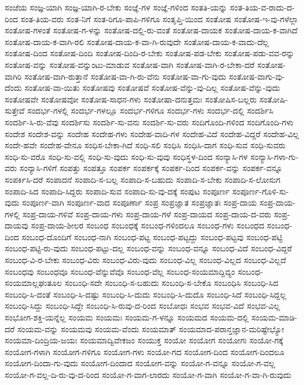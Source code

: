 {ಸಂಜೆಯ
ಸಂಜ್ಞ-ಯಾಗಿ
ಸಂಜ್ಞ-ಯಾಗಿ-ರ-ಬೇಕು
ಸಂಜ್ಞೆ-ಗಳ
ಸಂಜ್ಞೆ-ಗಳಿಂದ
ಸಂತತಿ-ಯನ್ನು
ಸಂತ-ತಿಯ-ವ-ರಾದು-ದ-ರಿಂದ
ಸಂತ-ತಿಯ-ವರು
ಸಂತ-ನಿಗೆ
ಸಂತ-ರಿಗೂ-ಪಾಪಿ-ಗಳಿಗೂ
ಸಂತೃಪ್ತಿ-ಯಿಂದ
ಸಂತೋಷ
ಸಂತೋಷ-ಇ-ವು-ಗಳೆಲ್ಲಾ
ಸಂತೋಷ-ಗಳಂತೆ
ಸಂತೋಷ-ಗ-ಳನ್ನು
ಸಂತೋಷ-ದಲ್ಲಿ-ರು-ವಂತೆ
ಸಂತೋಷ-ದಾಯಕ
ಸಂತೋಷ-ದಾಯ-ಕ-ವಾಗಿದೆ
ಸಂತೋಷ-ದಾಯ-ಕ-ವಾಗಿ-ರಲಿ
ಸಂತೋಷ-ದಾಯ-ಕ-ವಾ-ಗಿ-ರುವುದೇ
ಸಂತೋಷ-ದಾಯ-ಕ-ವಾದು-ದೆಲ್ಲ
ಸಂತೋಷ-ದಿಂದ
ಸಂತೋಷ-ದಿಂದಿ
ಸಂತೋಷ-ದಿಂದಿ-ರ-ಬೇಕು
ಸಂತೋಷ-ಪಡ-ಬೇಕು
ಸಂತೋಷ-ಪಡು-ವವ-ರನ್ನು
ಸಂತೋಷ-ವನ್ನು
ಸಂತೋಷ-ವನ್ನುಂಟು-ಮಾಡುವ
ಸಂತೋಷ-ವಾಗಿ
ಸಂತೋಷ-ವಾಗಿ-ರ-ಬೇಕಾ-ದರೆ
ಸಂತೋಷ-ವಾಗಿರಿ
ಸಂತೋಷ-ವಾಗಿ-ರುತ್ತಾನೆ
ಸಂತೋಷ-ವಾ-ಗಿ-ರು-ವೆನು
ಸಂತೋಷ-ವಾ-ಗು-ವುದು
ಸಂತೋಷ-ವಾಗು-ವು-ದೆಂದು
ಸಂತೋಷ-ವಾ-ಯಿತು
ಸಂತೋಷವು
ಸಂತೋಷವೆ
ಸಂತೋಷ-ವೆನ್ನು-ವು-ದಿಲ್ಲ
ಸಂತೋಷ-ವೆನ್ನು-ವುದು
ಸಂತೋಷವೇ
ಸಂತೋಷವೋ
ಸಂತೋಷ-ಸಾಧನ-ಗಳು
ಸಂತೋಷಾ-ದನುತ್ತಮಃ
ಸಂತೋಷಿಸ-ಬಲ್ಲರು
ಸಂತೋಷಿ-ಸುತ್ತೇವೆ
ಸಂದರ್ಭ-ಗಳಲ್ಲಿ
ಸಂದರ್ಭ-ಗಳಲ್ಲೂ
ಸಂದರ್ಭ-ಗಳಿಗೂ
ಸಂದರ್ಭ-ಗಳು
ಸಂದರ್ಭ-ದಲ್ಲಿ
ಸಂದರ್ಶಿಸಿ
ಸಂದರ್ಶಿ-ಸಿ-ರು-ವೆವು
ಸಂದರ್ಶಿಸು
ಸಂದರ್ಶಿ-ಸು-ವನು
ಸಂದರ್ಶಿ-ಸು-ವರು
ಸಂದಿಗೊಂದಿ-ಗಳಿಂದ
ಸಂದಿಗೊಂದಿ-ಗಳು
ಸಂದೇಶ
ಸಂದೇಶ-ವನ್ನು
ಸಂದೇಹ
ಸಂದೇಹ-ಗಳು
ಸಂದೇಹ-ವಾದಿ-ಗಳ
ಸಂದೇಹ-ವಿದೆ
ಸಂದೇಹ-ವಿದ್ದರೆ
ಸಂದೇಹ-ವಿಲ್ಲ
ಸಂದೇ-ಹವೇ
ಸಂದೇಹ-ವೇನೂ
ಸಂಧಿಸ-ಬೇಕಾ-ಗಿದೆ
ಸಂಧಿ-ಸಲಿ
ಸಂಧಿಸಿ
ಸಂಧಿಸಿ-ದಾಗ
ಸಂಧಿ-ಸುವ
ಸಂಧಿ-ಸುವರು
ಸಂಧಿ-ಸು-ವರೊ
ಸಂಧಿ-ಸು-ವಲ್ಲಿ
ಸಂಧಿ-ಸು-ವುದು
ಸಂಧಿ-ಸು-ವುವು
ಸಂಧಿಸ್ಥಳ-ದಿಂದ
ಸಂನ್ಯಾಸಿ-ಗಳ
ಸಂನ್ಯಾಸಿ-ಗಳಾ-ಗು-ವರು
ಸಂನ್ಯಾಸಿ-ಗಳಿಗೆ
ಸಂಪತ್ತು
ಸಂಪತ್ತೂ
ಸಂಪರ್ಕ
ಸಂಪರ್ಕಕ್ಕೆ
ಸಂಪರ್ಕ-ದಿಂದ
ಸಂಪರ್ಕ-ವನ್ನು
ಸಂಪರ್ಕ-ವನ್ನೂ
ಸಂಪರ್ಕಿಸಿ-ದರೆ
ಸಂಪಾದನೆ
ಸಂಪಾದಿ-ಸ-ಬಲ್ಲ
ಸಂಪಾದಿ-ಸ-ಬಹುದು
ಸಂಪಾದಿ-ಸ-ಬೇಕು
ಸಂಪಾದಿ-ಸ-ಲೋಸುಗ
ಸಂಪಾದಿ-ಸಿದ
ಸಂಪಾದಿ-ಸಿದ್ದರು
ಸಂಪಾದಿ-ಸುವ
ಸಂಪಾದಿ-ಸು-ವು-ದಕ್ಕೆ
ಸಂಪುಟ
ಸಂಪೂರ್ಣ
ಸಂಪೂರ್ಣ-ಗೊಳಿ-ಸು-ವುದು
ಸಂಪೂರ್ಣ-ವಾಗಿ
ಸಂಪೂರ್ಣ-ವಾದ
ಸಂಪೂರ್ಣಾ
ಸಂಪ್ರ
ಸಂಪ್ರಜ್ಞಾತ
ಸಂಪ್ರಜ್ಞಾತಃ
ಸಂಪ್ರ-ದಾಯ
ಸಂಪ್ರ-ದಾಯ-ಗಳಲ್ಲಿ
ಸಂಪ್ರ-ದಾಯ-ಗಳಿವೆ
ಸಂಪ್ರ-ದಾಯ-ಗಳು
ಸಂಪ್ರ-ದಾಯ-ಗಳೆ
ಸಂಪ್ರ-ದಾಯದ
ಸಂಪ್ರ-ದಾಯ-ದ-ವರು
ಸಂಪ್ರ-ದಾಯವು
ಸಂಪ್ರ-ದಾಯ-ಶೀಲರ
ಸಂಬಂಧ
ಸಂಬಂಧಕ್ಕೆ
ಸಂಬಂಧ-ಗಳಿಂದಲೂ
ಸಂಬಂಧ-ಗಳು
ಸಂಬಂಧದ
ಸಂಬಂಧ-ದಿಂದ
ಸಂಬಂಧ-ದೊಂದಿಗೆ
ಸಂಬಂಧ-ನಾಗಿ
ಸಂಬಂಧ-ಪಟ್ಟ
ಸಂಬಂಧ-ಪಟ್ಟದ್ದು
ಸಂಬಂಧ-ಪಟ್ಟವು
ಸಂಬಂಧ-ಪಟ್ಟಿ
ಸಂಬಂಧ-ಪಟ್ಟಿ-ರು-ವುದು
ಸಂಬಂಧ-ಪಟ್ಟು-ದಲ್ಲ
ಸಂಬಂಧ-ವನ್ನು
ಸಂಬಂಧ-ವನ್ನೂ
ಸಂಬಂಧ-ವಿದೆ
ಸಂಬಂಧ-ವಿದ್ದರೆ
ಸಂಬಂಧ-ವಿ-ರ-ಬೇಕು
ಸಂಬಂಧ-ವಿರು
ಸಂಬಂಧ-ವಿರು-ವುದು
ಸಂಬಂಧ-ವಿಲ್ಲ
ಸಂಬಂಧ-ವಿಲ್ಲದ
ಸಂಬಂಧ-ವಿಲ್ಲದೆ
ಸಂಬಂಧವು
ಸಂಬಂಧವೂ
ಸಂಬಂಧ-ವೆನ್ನುವೆವೊ
ಸಂಬಂಧ-ವೆಲ್ಲ
ಸಂಬಂಧ-ಸಂಯಮಾದ್ದಿವ್ಯಂ
ಸಂಬಂಧ-ಸಂಯಮಾಲ್ಲಘುತೂಲ
ಸಂಬಂಧಿ-ಸದೇ
ಸಂಬಂಧಿ-ಸ-ಬಹುದು
ಸಂಬಂಧಿ-ಸ-ಬೇಕೊ
ಸಂಬಂಧಿಸಿ
ಸಂಬಂಧಿ-ಸಿದ
ಸಂಬಂಧಿ-ಸಿ-ದಂತೆ
ಸಂಬಂಧಿ-ಸಿ-ದಷ್ಟು
ಸಂಬಂಧಿ-ಸಿ-ದುದು
ಸಂಬಂಧಿ-ಸಿ-ದುದೊ
ಸಂಬಂಧಿ-ಸಿದೆ
ಸಂಬಂಧಿ-ಸಿದ್ದಲ್ಲ
ಸಂಬಂಧಿ-ಸಿದ್ದು
ಸಂಬಂಧಿ-ಸಿದ್ದೇ
ಸಂಬಂಧಿ-ಸಿ-ರುವು-ದ-ರಿಂದ
ಸಂಬೋಧಃ
ಸಂಭವ
ಸಂಭವ-ವಿದೆ
ಸಂಭವ-ವಿಲ್ಲ
ಸಂಭೋಗ-ಶಕ್ತಿ-ಯನ್ನೆಲ್ಲ
ಸಂಯಮ
ಸಂಯಮಃ
ಸಂಯಮ-ಗ-ಳನ್ನೂ
ಸಂಯಮದ
ಸಂಯಮ-ದಲ್ಲಿ
ಸಂಯಮ-ಮಾಡಿ-ದರೆ
ಸಂಯಮ-ವನ್ನು
ಸಂಯಮವು
ಸಂಯಮ-ವೆಂದು
ಸಂಯಮಾತ್
ಸಂಯಮಾದ-ಪರಾನ್ತಜ್ಞಾನ-ಮರಿಷ್ಟೇಭ್ಯೋ
ಸಂಯಮಾ-ದಿಂದ್ರಿಯ-ಜಯಃ
ಸಂಯಮಾದ್ವಿವೇಕಜಂ
ಸಂಯುಕ್ತ
ಸಂಯೋ
ಸಂಯೋಗ
ಸಂಯೋಗಃ
ಸಂಯೋ-ಗಕ್ಕೆ
ಸಂಯೋಗ-ಗಳಾಗಿ
ಸಂಯೋಗ-ಗಳಿಗೂ
ಸಂಯೋಗ-ಗಳು
ಸಂಯೋ-ಗದ
ಸಂಯೋಗ-ದಿಂದ
ಸಂಯೋಗ-ದಿಂದಲೂ
ಸಂಯೋಗ-ದಿಂದಾ-ಗು-ವುದು
ಸಂಯೋಗ-ದಿಂದಾದ
ಸಂಯೋಗ-ವನ್ನು
ಸಂಯೋ-ಗ-ವನ್ನೂ
ಸಂಯೋ-ಗ-ವಲ್ಲ
ಸಂಯೋ-ಗ-ವಲ್ಲ-ದಿ-ರು-ವು-ದ-ರಿಂದ
ಸಂಯೋ-ಗ-ವಾಗ-ಲಾರದು
ಸಂಯೋ-ಗ-ವಾಗಿ
ಸಂಯೋ-ಗ-ವಾ-ಗಿ-ರುವುದು
}
